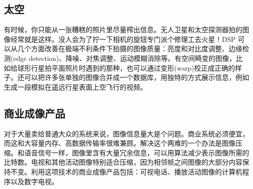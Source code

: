 \subsection{太空}

有时候，你只能从一张糟糕的照片里尽量榨出信息。无人卫星和太空探测器拍的图像经常就是这样。没人会为了拧一下相机的旋钮专门派个修理工去火星！DSP
可以从几个方面改善在极端不利条件下拍摄的图像质量：亮度和对比度调整、边缘检测(edge
detection)、降噪、对焦调整、运动模糊消除等。有空间畸变的图像，比如给球形行星拍平面照片时遇到的那种，也可以通过变形(warp)校正成正确的样子。还可以把许多张单独的图像合并成一个数据库，用独特的方式展示信息，例如生成一段模拟在遥远行星表面上空飞行的视频。

\subsection{商业成像产品}

对于大量卖给普通大众的系统来说，图像信息量大是个问题。商业系统必须便宜，而这和大容量内存、高数据传输率很难兼顾。解决这个两难的一个办法是图像压缩。和语音信号一样，图像里含有大量冗余信息，可以用算法减少表示图像所需的比特数。电视和其他活动图像特别适合压缩，因为相邻帧之间图像的大部分内容保持不变。利用这项技术的商业成像产品包括：可视电话、播放活动图像的计算机程序以及数字电视。
